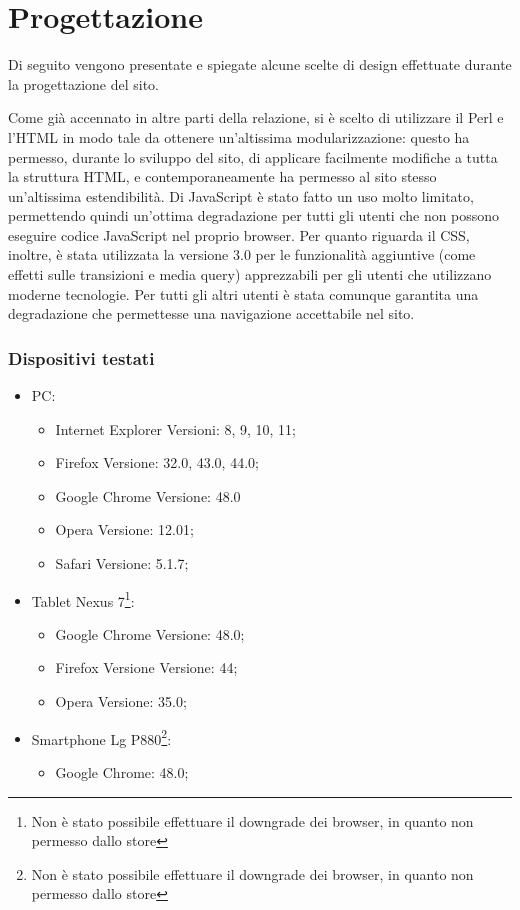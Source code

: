 \section{Progettazione}

Di seguito vengono presentate e spiegate alcune scelte di design effettuate durante la progettazione del sito.


Come già accennato in altre parti della relazione, si è scelto di utilizzare il Perl e l'HTML in modo tale da ottenere un'altissima modularizzazione: questo ha permesso, durante lo sviluppo del sito, di applicare facilmente modifiche a tutta la struttura HTML, e contemporaneamente ha permesso al sito stesso un'altissima estendibilità. Di JavaScript \`e stato fatto un uso molto limitato, permettendo quindi un'ottima degradazione per tutti gli utenti che non possono eseguire codice JavaScript nel proprio browser. Per quanto riguarda il CSS, inoltre, è stata utilizzata la versione 3.0 per le funzionalità aggiuntive (come effetti sulle transizioni e media query) apprezzabili per gli utenti che utilizzano moderne tecnologie. Per tutti gli altri utenti è stata comunque garantita una degradazione che permettesse una navigazione accettabile nel sito.

\subsubsection{Dispositivi testati}
\begin{itemize}
	\item PC:
		\begin{itemize}
			\item Internet Explorer Versioni: 8, 9, 10, 11;
			\item Firefox Versione: 32.0, 43.0, 44.0;
			\item Google Chrome Versione: 48.0
			\item Opera Versione: 12.01;
			\item Safari Versione: 5.1.7;
		\end{itemize}
	\item Tablet Nexus 7\footnote{Non \`e stato possibile effettuare il downgrade dei browser, in quanto non permesso dallo store}:
		\begin{itemize}
			\item Google Chrome Versione: 48.0;
			\item Firefox Versione Versione: 44;
			\item Opera Versione: 35.0;
		\end{itemize}
	\item Smartphone Lg P880\footnote{Non \`e stato possibile effettuare il downgrade dei browser, in quanto non permesso dallo store}:
		\begin{itemize}
			\item Google Chrome: 48.0;
		\end{itemize}
\end{itemize}
